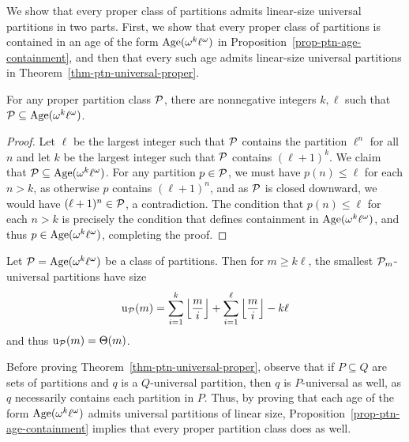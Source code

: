 We show that every proper class of partitions admits linear-size universal partitions in two parts. First, we show that every proper class of partitions is contained in an age of the form $\Age(\omega^k \ell^\omega)$ in Proposition~\ref{prop-ptn-age-containment}, and then that every such age admits linear-size universal partitions in Theorem~\ref{thm-ptn-universal-proper}.
\begin{proposition}
\label{prop-ptn-age-containment}
	For any proper partition class $\P$, there are nonnegative integers $k, \ell$ such that $\P \subseteq \Age(\omega^k \ell^\omega)$.
\end{proposition}
\begin{proof}
	Let $\ell$ be the largest integer such that $\P$ contains the partition $\ell^n$ for all $n$ and let $k$ be the largest integer such that $\P$ contains $(\ell+1)^k$. We claim that $\P \subseteq \Age(\omega^k \ell^\omega)$. For any partition $p \in \P$, we must have $p(n) \le \ell$ for each $n > k$, as otherwise $p$ contains $(\ell+1)^n$, and as $\P$ is closed downward, we would have $(\ell+1)^n \in \P$, a contradiction. The condition that $p(n) \le \ell$ for each $n > k$ is precisely the condition that defines containment in $\Age(\omega^k \ell^\omega)$, and thus $p \in \Age(\omega^k \ell^\omega)$, completing the proof.
\end{proof}

\begin{theorem}
\label{thm-ptn-universal-proper}
	Let $\P = \Age(\omega^k \ell^\omega)$ be a class of partitions. Then for $m \ge k\ell$, the smallest $\P_m$-universal partitions have size
	\[
		\u_{\P}(m)
		= 
		\sum_{i=1}^{k} \floor{\frac{m}{i}} + \sum_{i=1}^{\ell} \floor{\frac{m}{i}} - k\ell
	\]
	and thus $\u_{\P}(m) = \oTheta{m}$.
\end{theorem}

Before proving Theorem~\ref{thm-ptn-universal-proper}, observe that if $P \subseteq Q$ are sets of partitions and $q$ is a $Q$-universal partition, then $q$ is $P$-universal as well, as $q$ necessarily contains each partition in $P$. Thus, by proving that each age of the form $\Age(\omega^k \ell^\omega)$ admits universal partitions of linear size, Proposition~\ref{prop-ptn-age-containment} implies that every proper partition class does as well.

